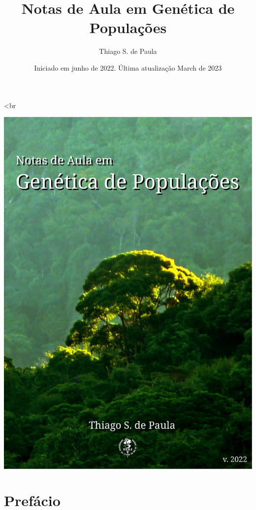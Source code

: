\documentclass[
]{book}
\title{Notas de Aula em Genética de Populações}
\author{Thiago S. de Paula}
\date{Iniciado em junho de 2022. Última atualização March de 2023}
\begin{document}
\maketitle

{
\setcounter{tocdepth}{1}
\tableofcontents
}
\hypertarget{section}{%
\chapter*{}\label{section}}

\textless br

\begin{center}\includegraphics[width=600px]{figs/capa_v.2022} \end{center}

\hypertarget{prefuxe1cio}{%
\chapter*{Prefácio}\label{prefuxe1cio}}
\end{document}
